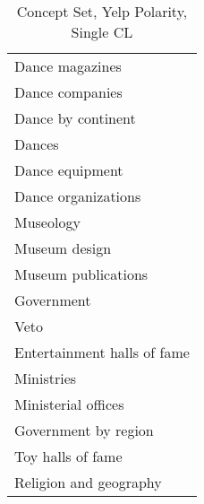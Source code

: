 \begin{table*}[h]
\begin{minipage}{0.48\textwidth}
\begin{tabular}{|l|}
Dance magazines \\
Dance companies \\
Dance by continent \\
Dances \\
Dance equipment \\
Dance organizations \\
Museology \\
Museum design \\
Museum publications \\
Government \\
Veto \\
Entertainment halls of fame \\
Ministries \\
Ministerial offices \\
Government by region \\
Toy halls of fame \\
Religion and geography \\
\hline
\end{tabular}
\end{minipage}

\caption{Concept Set, Yelp Polarity, Single CL}
\label{tab:yelp4}
\end{table*}
